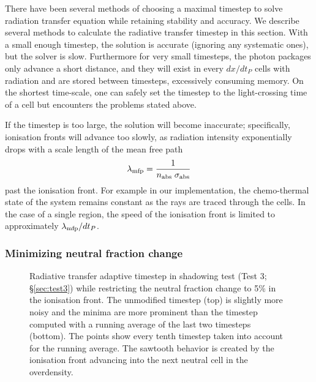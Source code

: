 \documentclass[useAMS,usenatbib]{mn2e}
\begin{document}
There have been several methods of choosing a maximal timestep to
solve radiation transfer equation while retaining stability and
accuracy.  We describe several methods to calculate the radiative
transfer timestep in this section.  With a small enough timestep, the
solution is accurate (ignoring any systematic ones), but the solver is
slow.  Furthermore for very small timesteps, the photon packages only
advance a short distance, and they will exist in every $dx/dt_P$ cells
with radiation and are stored between timesteps, excessively consuming
memory.  On the shortest time-scale, one can safely set the timestep to
the light-crossing time of a cell \citep{Abel99_RT, Trac07} but
encounters the problems stated above.

If the timestep is too large, the solution will become inaccurate;
specifically, ionisation fronts will advance too slowly, as radiation
intensity exponentially drops with a scale length of the mean free
path
\begin{equation}
  \label{eqn:mfp}
  \lambda_{\rm mfp} = \frac{1}{n_{\rm abs} \; \sigma_{\rm abs}}
\end{equation}
past the ionisation front.  For example in our implementation, the
chemo-thermal state of the system remains constant as the rays are
traced through the cells.  In the case of a single \hii region,
the speed of the ionisation front is limited to approximately
$\lambda_{\rm mfp} / dt_P$.

\subsubsection{Minimizing neutral fraction change}
\label{sec:dt_hi}

\begin{figure}
  \caption{\label{fig:dtsmooth} Radiative transfer adaptive timestep
    in shadowing test (Test 3; \S\ref{sec:test3}) while restricting
    the neutral fraction change to 5\% in the ionisation front.  The
    unmodified timestep (top) is slightly more noisy and the minima
    are more prominent than the timestep computed with a running
    average of the last two timesteps (bottom).  The points show every
    tenth timestep taken into account for the running average.  The
    sawtooth behavior is created by the ionisation front advancing
    into the next neutral cell in the overdensity.}
\end{figure}
\end{document}
